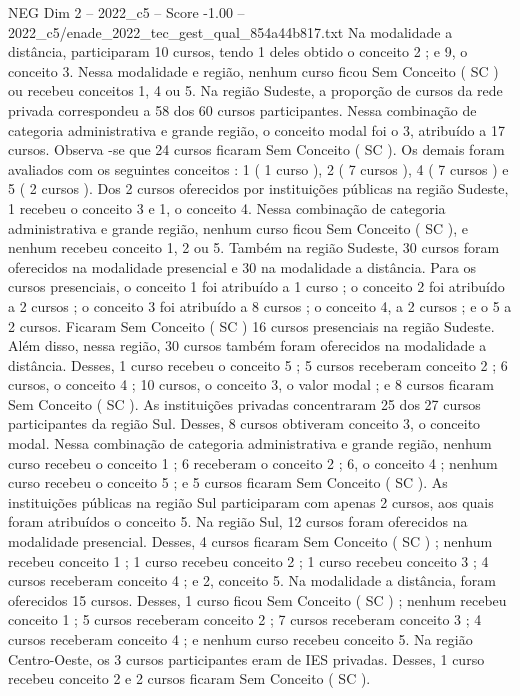 \begin{textsample}{NEG Dim 2 – 2022\_c5 – Score -1.00 – 2022\_c5/enade\_2022\_tec\_gest\_qual\_854a44b817.txt}
Na modalidade a distância, participaram 10 cursos, tendo 1 deles obtido o conceito 2 ; e 9, o conceito 3.
Nessa modalidade e região, nenhum curso ficou Sem Conceito ( SC ) ou recebeu conceitos 1, 4 ou 5.
Na região Sudeste, a proporção de cursos da rede privada correspondeu a 58 dos 60 cursos participantes.
Nessa combinação de categoria administrativa e grande região, o conceito modal foi o 3, atribuído a 17 cursos.
Observa -se que 24 cursos ficaram Sem Conceito ( SC ).
Os demais foram avaliados com os seguintes conceitos : 1 ( 1 curso ), 2 ( 7 cursos ), 4 ( 7 cursos ) e 5 ( 2 cursos ).
Dos 2 cursos oferecidos por instituições públicas na região Sudeste, 1 recebeu o conceito 3 e 1, o conceito 4.
Nessa combinação de categoria administrativa e grande região, nenhum curso ficou Sem Conceito ( SC ), e nenhum recebeu conceito 1, 2 ou 5.
Também na região Sudeste, 30 cursos foram oferecidos na modalidade presencial e 30 na modalidade a distância.
Para os cursos presenciais, o conceito 1 foi atribuído a 1 curso ; o conceito 2 foi atribuído a 2 cursos ; o conceito 3 foi atribuído a 8 cursos ; o conceito 4, a 2 cursos ; e o 5 a 2 cursos.
Ficaram Sem Conceito ( SC ) 16 cursos presenciais na região Sudeste.
Além disso, nessa região, 30 cursos também foram oferecidos na modalidade a distância.
Desses, 1 curso recebeu o conceito 5 ; 5 cursos receberam conceito 2 ; 6 cursos, o conceito 4 ; 10 cursos, o conceito 3, o valor modal ; e 8 cursos ficaram Sem Conceito ( SC ).
As instituições privadas concentraram 25 dos 27 cursos participantes da região Sul.
Desses, 8 cursos obtiveram conceito 3, o conceito modal.
Nessa combinação de categoria administrativa e grande região, nenhum curso recebeu o conceito 1 ; 6 receberam o conceito 2 ; 6, o conceito 4 ; nenhum curso recebeu o conceito 5 ; e 5 cursos ficaram Sem Conceito ( SC ).
As instituições públicas na região Sul participaram com apenas 2 cursos, aos quais foram atribuídos o conceito 5.
Na região Sul, 12 cursos foram oferecidos na modalidade presencial.
Desses, 4 cursos ficaram Sem Conceito ( SC ) ; nenhum recebeu conceito 1 ; 1 curso recebeu conceito 2 ; 1 curso recebeu conceito 3 ; 4 cursos receberam conceito 4 ; e 2, conceito 5.
Na modalidade a distância, foram oferecidos 15 cursos.
Desses, 1 curso ficou Sem Conceito ( SC ) ; nenhum recebeu conceito 1 ; 5 cursos receberam conceito 2 ; 7 cursos receberam conceito 3 ; 4 cursos receberam conceito 4 ; e nenhum curso recebeu conceito 5.
Na região Centro-Oeste, os 3 cursos participantes eram de IES privadas.
Desses, 1 curso recebeu conceito 2 e 2 cursos ficaram Sem Conceito ( SC ).

\end{textsample}
